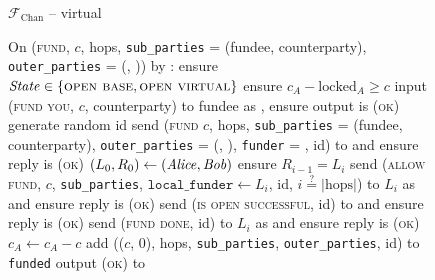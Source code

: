 \begin{figure}[H]
\begin{systembox}{$\mathcal{F}_{\mathrm{Chan}}$ -- virtual}
\begin{algorithmic}[1]
      \State On (\textsc{fund}, $c$, hops, \texttt{sub\_parties} = (fundee,
      counterparty), \texttt{outer\_parties} = (\alice, \dave)) by \alice:
      \label{code:functionality:chan:skeleton:virtual:fund}
      \Indent
        \State ensure $\mathit{State} \in \{\textsc{open base}, \textsc{open
        virtual}\}$
        \State ensure $c_A - \mathrm{locked}_A \geq c$
        \State input (\textsc{fund you}, $c$, counterparty) to fundee as \alice,
        ensure output is (\textsc{ok})
        \label{code:functionality:chan:skeleton:virtual:subfunc}
        \State generate random id
        \label{code:functionality:chan:skeleton:virtual:id}
        \State send (\textsc{fund} $c$, hops, \texttt{sub\_parties} = (fundee,
        counterparty), \texttt{outer\_parties} = (\alice, \dave),
        \texttt{funder} = \alice, id) to \adversary and ensure reply is
        (\textsc{ok})
        \label{code:functionality:chan:skeleton:virtual:fund}
        \State $(L_0, R_0) \gets (\mathit{Alice}, \mathit{Bob})$
        \label{code:functionality:chan:skeleton:virtual:fund:init}
         
        \label{code:functionality:chan:skeleton:virtual:fund:for:allow:start}
          \State ensure $R_{i-1} = L_i$
          \State send (\textsc{allow fund}, $c$, \texttt{sub\_parties},
          $\mathtt{local\_funder} \gets L_i$, id, $i \overset{?}{=}
          |\mathrm{hops}|$) to $L_i$ as \alice and ensure reply is (\textsc{ok})
          \label{code:functionality:chan:skeleton:virtual:fund:for:allow:send}
        \EndFor
        \label{code:functionality:chan:skeleton:virtual:fund:for:allow:end}
        \State send (\textsc{is open successful}, id) to \adversary and ensure
        reply is (\textsc{ok})
        \label{code:functionality:chan:skeleton:virtual:fund:simulate}
         
        \label{code:functionality:chan:skeleton:virtual:fund:confirm}
          \State send (\textsc{fund done}, id) to $L_i$ as \alice and ensure
          reply is (\textsc{ok})
        \EndFor
        \State $c_A \gets c_A - c$
        \State add (($c$, 0), hops, \texttt{sub\_parties},
        \texttt{outer\_parties}, id) to \texttt{funded}
        \label{code:functionality:chan:skeleton:virtual:fund:store}
        \State output (\textsc{ok}) to \alice
      \EndIndent
      \Statex


\end{algorithmic}
\end{systembox}
\end{figure}
